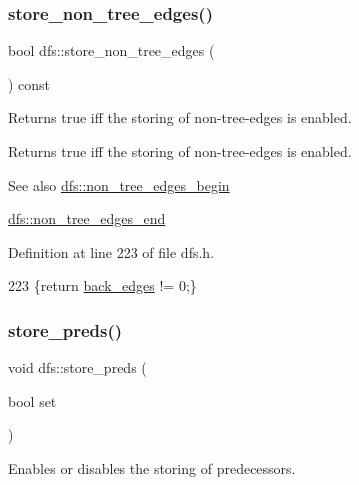 \subsubsection{\texorpdfstring{store\+\_\+non\+\_\+tree\+\_\+edges()}{store\_non\_tree\_edges()}\hspace{0.1cm}{\footnotesize\ttfamily [2/2]}}
{\footnotesize\ttfamily bool dfs\+::store\+\_\+non\+\_\+tree\+\_\+edges (\begin{DoxyParamCaption}{ }\end{DoxyParamCaption}) const\hspace{0.3cm}{\ttfamily [inline]}}



Returns true iff the storing of non-\/tree-\/edges is enabled. 

\begin{DoxyReturn}{Returns}
true iff the storing of non-\/tree-\/edges is enabled. 
\end{DoxyReturn}
\begin{DoxySeeAlso}{See also}
\mbox{\hyperlink{classdfs_a4efe5bb72d00305e6b226e67c2b2ef6e}{dfs\+::non\+\_\+tree\+\_\+edges\+\_\+begin}} 

\mbox{\hyperlink{classdfs_ad9cd92a18bda23edca8ab3ac60a15ef4}{dfs\+::non\+\_\+tree\+\_\+edges\+\_\+end}} 
\end{DoxySeeAlso}


Definition at line 223 of file dfs.\+h.


\begin{DoxyCode}
223 \{\textcolor{keywordflow}{return} \mbox{\hyperlink{classdfs_a1dc18a7df8d6b238d5301c92fc7540fa}{back\_edges}} != 0;\}
\end{DoxyCode}
\mbox{\label{classdfs_a7043f46eb3887cbcbb1391fc783407a4}} 
\subsubsection{\texorpdfstring{store\+\_\+preds()}{store\_preds()}\hspace{0.1cm}{\footnotesize\ttfamily [1/2]}}
{\footnotesize\ttfamily void dfs\+::store\+\_\+preds (\begin{DoxyParamCaption}\item[{bool}]{set }\end{DoxyParamCaption})}



Enables or disables the storing of predecessors. 

